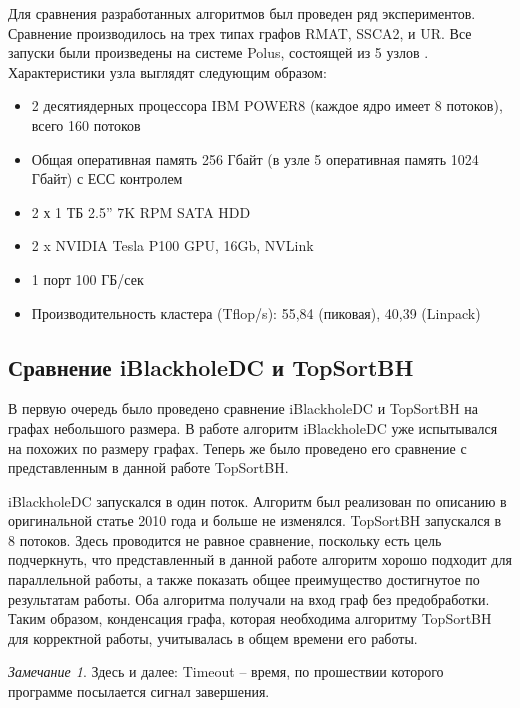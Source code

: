 \documentclass[12pt,a4paper,oneside,openany]{article}
\theoremstyle{definition}
\theoremstyle{lemma}
\theoremstyle{remark}
\newtheorem{remark}{Замечание}[]
\begin{document}
Для сравнения разработанных алгоритмов был проведен ряд экспериментов.
Сравнение производилось на трех типах графов RMAT, SSCA2, и UR.
Все запуски были произведены на системе Polus, состоящей из 5 узлов \cite{polus}.
Характеристики узла выглядят следующим образом:
\begin{itemize}
\item 2 десятиядерных процессора IBM POWER8 (каждое ядро имеет 8 потоков), всего 160 потоков
\item Общая оперативная память 256 Гбайт (в узле 5 оперативная память 1024 Гбайт) с ЕСС контролем
\item 2 х 1 ТБ 2.5” 7K RPM SATA HDD
\item 2 x NVIDIA Tesla P100 GPU, 16Gb, NVLink
\item 1 порт 100 ГБ/сек
\item Производительность кластера (Tflop/s): 55,84 (пиковая), 40,39 (Linpack)
\end{itemize}

\subsection{Сравнение iBlackholeDC и TopSortBH}\label{subsec:vanillasucks}

В первую очередь было проведено сравнение iBlackholeDC и TopSortBH на графах небольшого размера.
В работе \cite{li2010detecting} алгоритм iBlackholeDC уже испытывался на похожих по размеру графах.
Теперь же было проведено его сравнение с представленным в данной работе TopSortBH.

iBlackholeDC запускался в один поток. Алгоритм был реализован по описанию в оригинальной статье 2010
года и больше не изменялся.
TopSortBH запускался в 8 потоков. Здесь проводится не равное сравнение, поскольку
есть цель подчеркнуть, что представленный в данной работе алгоритм хорошо подходит для параллельной работы, а также
показать общее преимущество достигнутое по результатам работы.
Оба алгоритма получали на вход граф без предобработки. Таким образом, конденсация графа,
которая необходима алгоритму TopSortBH для корректной работы, учитывалась в общем времени его работы.

\begin{remark}
    Здесь и далее: Timeout -- время, по прошествии которого программе посылается сигнал завершения.
\end{remark}
\end{document}
